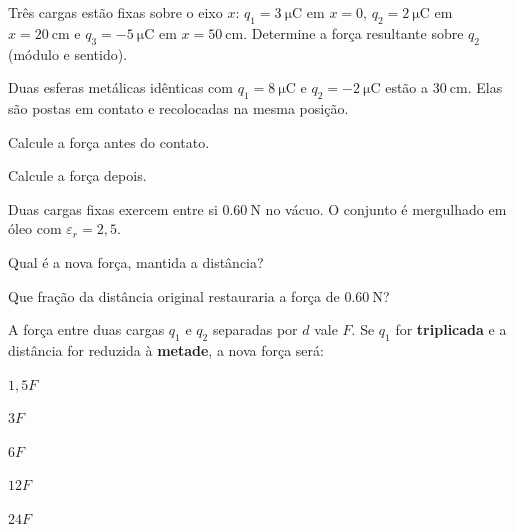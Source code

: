 \blocoaplicacao
\begin{questao}[2]{}

Três cargas estão fixas sobre o eixo $x$: $q_1=\SI{+3}{\micro\coulomb}$ em
$x=0$, $q_2=\SI{+2}{\micro\coulomb}$ em $x=\SI{20}{\centi\meter}$ e
$q_3=\SI{-5}{\micro\coulomb}$ em $x=\SI{50}{\centi\meter}$. Determine a força
resultante sobre $q_2$ (módulo e sentido).


\end{questao}
\begin{questao}[2]{}

Duas esferas metálicas idênticas com $q_1=\SI{+8}{\micro\coulomb}$ e
$q_2=\SI{-2}{\micro\coulomb}$ estão a $\SI{30}{\centi\meter}$. Elas são postas
em contato e recolocadas na mesma posição.
\begin{itensq}
\item Calcule a força antes do contato.
\item Calcule a força depois.
\end{itensq}


\end{questao}
\begin{questao}[2]{}

Duas cargas fixas exercem entre si $\SI{0.60}{\newton}$ no vácuo. O conjunto é
mergulhado em óleo com $\varepsilon_r=2{,}5$.
\begin{itensq}
\item Qual é a nova força, mantida a distância?
\item Que fração da distância original restauraria a força de
      $\SI{0.60}{\newton}$?
\end{itensq}


\end{questao}
\begin{questao}[2]{}

A força entre duas cargas $q_1$ e $q_2$ separadas por $d$ vale $F$. Se $q_1$ for
\textbf{triplicada} e a distância for reduzida à \textbf{metade}, a nova força
será:
\begin{alternativas}[3]
\item $1{,}5F$
\item $3F$
\item $6F$
\item $12F$
\item $24F$
\end{alternativas}


\end{questao}
